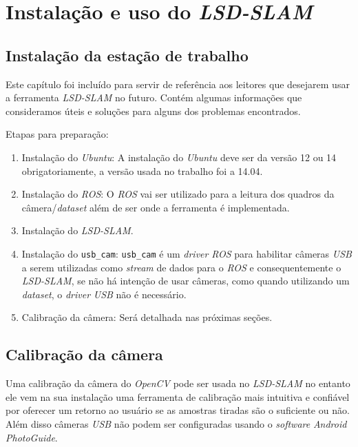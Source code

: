 \chapter{Instalação e uso do \textit{LSD-SLAM}}



\section{Instalação da estação de trabalho}

Este capítulo foi incluído para servir de referência aos leitores que desejarem usar a ferramenta \textit{LSD-SLAM} no futuro. Contém algumas informações que consideramos úteis e soluções para alguns dos problemas encontrados.

Etapas para preparação:

\begin{enumerate}
	\item{Instalação do \textit{Ubuntu}: A instalação do \textit{Ubuntu} deve ser da versão 12 ou 14 obrigatoriamente, a versão usada no trabalho foi a 14.04.}
	\item{Instalação do  \textit{ROS}: O \textit{ROS} vai ser utilizado para a leitura dos quadros da câmera/\textit{dataset} além de ser onde a ferramenta é implementada.\cite{ROS-Tutorial}}
	\item{Instalação do \textit{LSD-SLAM}.\cite{GitHub-LSD-SLAM}}
	\item{Instalação do  \texttt{usb\_cam}: \texttt{usb\_cam} é um \textit{driver} \textit{ROS} para habilitar câmeras \textit{USB} a serem utilizadas como \textit{stream} de dados para o \textit{ROS} e consequentemente o \textit{LSD-SLAM}, se não há intenção de usar câmeras, como quando utilizando um \textit{dataset}, o \textit{driver} \textit{USB} não é necessário.}
	\item{Calibração da câmera: Será detalhada nas próximas seções.}
\end{enumerate}

\section{Calibração da câmera}

Uma calibração da câmera do \textit{OpenCV} pode ser usada no \textit{LSD-SLAM} no entanto ele vem na sua instalação uma ferramenta de calibração mais intuitiva e confiável por oferecer um retorno ao usuário se as amostras tiradas são o suficiente ou não. Além disso câmeras \textit{USB} não podem ser configuradas usando o \textit{software} \textit{Android} \textit{PhotoGuide}.

